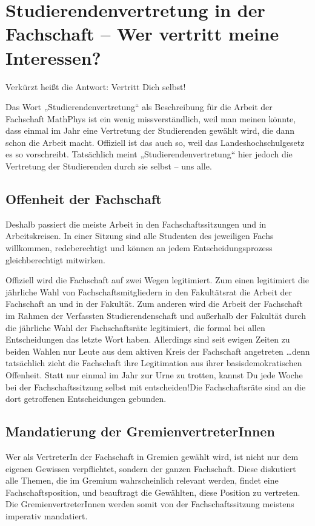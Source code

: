\section[Studierendenvertretung in der Fachschaft]{Studierendenvertretung in der Fachschaft -- Wer vertritt meine Interessen?}

Verkürzt heißt die Antwort: Vertritt Dich selbst!

Das Wort „Studierendenvertretung“ als Beschreibung für die Arbeit der Fachschaft MathPhys ist ein wenig missverständlich, weil man meinen könnte, dass einmal im Jahr eine Vertretung der Studierenden gewählt wird, die dann schon die Arbeit macht. Offiziell ist das auch so, weil das Landeshochschulgesetz es so vorschreibt. Tatsächlich meint „Studierendenvertretung“ hier jedoch die Vertretung der Studierenden durch sie selbst -- uns alle.

\subsection*{Offenheit der Fachschaft}

Deshalb passiert die meiste Arbeit in den Fachschaftssitzungen und in Arbeitskreisen. In einer Sitzung sind alle Studenten des jeweiligen Fachs willkommen, redeberechtigt und können an jedem Entscheidungsprozess gleichberechtigt mitwirken.

Offiziell wird die Fachschaft auf zwei Wegen legitimiert. Zum einen legitimiert die jährliche Wahl von Fachschaftsmitgliedern in den Fakultätsrat die Arbeit der Fachschaft an und in der Fakultät. Zum anderen wird die Arbeit der Fachschaft im Rahmen der Verfassten Studierendenschaft und außerhalb der Fakultät durch die jährliche Wahl der Fachschaftsräte legitimiert, die formal bei allen Entscheidungen das letzte Wort haben. Allerdings sind seit ewigen Zeiten zu beiden Wahlen nur Leute aus dem aktiven Kreis der Fachschaft angetreten \dots denn tatsächlich zieht die Fachschaft ihre Legitimation aus ihrer basisdemokratischen Offenheit. Statt nur einmal im Jahr zur Urne zu trotten, kannst Du jede Woche bei der Fachschaftssitzung selbst mit entscheiden!Die Fachschaftsräte sind an die dort getroffenen Entscheidungen gebunden.

\subsection*{Mandatierung der GremienvertreterInnen}

Wer als VertreterIn der Fachschaft in Gremien gewählt wird, ist nicht nur dem eigenen Gewissen verpflichtet, sondern der ganzen Fachschaft. Diese diskutiert alle Themen, die im Gremium wahrscheinlich relevant werden, findet eine Fachschaftsposition, und beauftragt die Gewählten, diese Position zu vertreten. Die GremienvertreterInnen werden somit von der Fachschaftssitzung meistens imperativ mandatiert.

